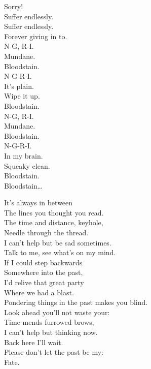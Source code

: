 Sorry! \\

Suffer endlessly. \\
Suffer endlessly. \\
Forever giving in to. \\

N-G, R-I. \\
Mundane. \\
Bloodstain. \\
N-G-R-I. \\
It's plain. \\
Wipe it up. \\
Bloodstain. \\

N-G, R-I. \\
Mundane. \\
Bloodstain. \\
N-G-R-I. \\
In my brain. \\
Squeaky clean. \\
Bloodstain. \\

Bloodstain… \\




It's always in between \\
The lines you thought you read. \\
The time and distance, keyhole, \\
Needle through the thread. \\
I can't help but be sad sometimes. \\
Talk to me, see what's on my mind. \\

If I could step backwards \\
Somewhere into the past, \\
I'd relive that great party \\
Where we had a blast. \\
Pondering things in the past makes you blind. \\
Look ahead you'll not waste your: \\

Time mends furrowed brows, \\
I can't help but thinking now. \\
Back here I'll wait. \\
Please don't let the past be my: \\
Fate. \\

